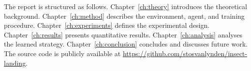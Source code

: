 The report is structured as follows.
Chapter~\ref{ch:theory} introduces the theoretical background.
Chapter~\ref{ch:method} describes the environment, agent, and training procedure.
Chapter~\ref{ch:experiments} defines the experimental design.
Chapter~\ref{ch:results} presents quantitative results.
Chapter~\ref{ch:analysis} analyses the learned strategy.
Chapter~\ref{ch:conclusion} concludes and discusses future work.
The source code is publicly available at \url{https://github.com/stosvanlynden/insect-landing}.
